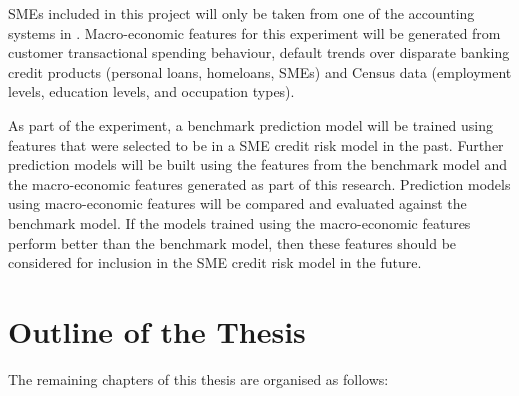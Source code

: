 SMEs included in this project will only be taken from one of the accounting systems in \subjectname. Macro-economic features for this experiment will be generated from customer transactional spending behaviour, default trends over disparate banking credit products (personal loans, homeloans, SMEs) and Census data (employment levels, education levels, and occupation types).

As part of the experiment, a benchmark prediction model will be trained using features that were selected to be in a SME credit risk model in the past. Further prediction models will be built using the features from the benchmark model and the macro-economic features generated as part of this research. Prediction models using macro-economic features will be compared and evaluated against the benchmark model. If the models trained using the  macro-economic features perform better than the benchmark model, then these features should be considered for inclusion in the SME credit risk model in the future. 



\section{Outline of the Thesis}
The remaining chapters of this thesis are organised as follows:


